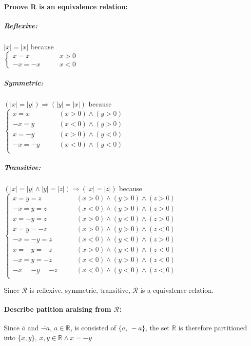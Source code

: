 \documentclass{article}
\begin{document}
\paragraph{Proove R is an equivalence relation:}
	\subparagraph{Reflexive: } $|x| = |x|$ because \\
		$\begin{cases}
			x=x \qquad &x>0\\
			-x=-x \qquad &x<0
		\end{cases}$ \\
	\subparagraph{Symmetric: } $(|x| = |y|) \Rightarrow (|y|=|x|)$ because \\
		$\begin{cases}
			x=x \qquad &(x>0) \wedge (y>0)\\
			-x=y \qquad &(x<0) \wedge (y>0)\\
			x=-y \qquad &(x>0) \wedge (y<0)\\
			-x=-y \qquad &(x<0) \wedge (y<0)\\
		\end{cases}$ \\
	\subparagraph{Transitive: } $(|x| = |y| \wedge |y| = |z|) \Rightarrow
		(|x|=|z|)$ because \\
			$\begin{cases}
				x=y=z \qquad &(x>0) \wedge (y>0) \wedge (z>0)\\
				-x=y=z \qquad &(x<0) \wedge (y>0) \wedge (z>0)\\
				x=-y=z \qquad &(x>0) \wedge (y<0) \wedge (z>0)\\
				x=y=-z \qquad &(x>0) \wedge (y>0) \wedge (z<0)\\
				-x=-y=z \qquad &(x<0) \wedge (y<0) \wedge (z>0)\\
				x=-y=-z \qquad &(x>0) \wedge (y<0) \wedge (z<0)\\
				-x=y=-z \qquad &(x<0) \wedge (y>0) \wedge (z<0)\\
				-x=-y=-z \qquad &(x<0) \wedge (y<0) \wedge (z<0)\\
			\end{cases}$ \\

		\par Since $\mathcal{R}$ is reflexive, symmetric, transitive, $\mathcal{R}$ 
		is a equivalence relation.
\paragraph{Describe patition araising from $\mathcal{R}$: }
	Since $\overline{a}$ and $\overline{-a}$, $a\in\mathbb{R}$, is consisted of
	$\{a,\ -a\}$, the set $\mathbb{R}$ is therefore partitioned into $\{x, y\},\
	x,y\in\mathbb{R} \wedge x=-y$
\end{document}

